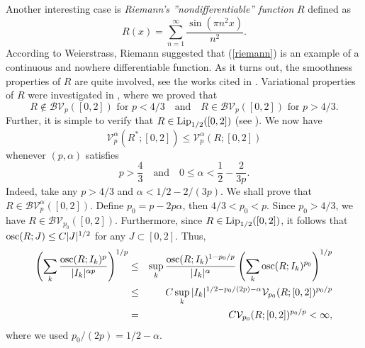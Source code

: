 \documentclass{amsart}
\DeclareMathOperator{\osc}{{\rm osc}}
\numberwithin{equation}{section}
\begin{document}
Another interesting case is \emph{Riemann's ''nondifferentiable'' function} $R$ defined as
\begin{equation}
    \label{riemann}
    R(x)=\sum_{n=1}^\infty\frac{\sin(\pi n^2x)}{n^2}.
\end{equation}
According to Weierstrass, Riemann suggested that (\ref{riemann}) is an example of a continuous and nowhere differentiable function. As it turns out, the smoothness properties of $R$ are quite involved, see the works cited in \cite{Li26}. Variational properties of $R$ were investigated in \cite{Li26}, where we proved that
\begin{equation}
    \label{p-var-R}
    R\notin\mathcal{BV}_p([0,2])\text{ for }p<4/3\quad\text{and}\quad R\in\mathcal{BV}_p([0,2])\text{ for }p>4/3.
\end{equation}
Further, it is simple to verify that $R\in{\rm Lip}_{1/2}([0,2])$ (see \cite{Li26}). We now have
\begin{equation}
    \nonumber
    \mathcal{V}_p^\alpha(R^*;[0,2])\le\mathcal{V}_p^\alpha(R;[0,2])
\end{equation}
whenever $(p,\alpha)$ satisfies
\begin{equation}
    \label{parameterChoice}
    p>\frac{4}{3}\quad\text{and}\quad0\le \alpha<\frac{1}{2}-\frac{2}{3p}.
\end{equation}
Indeed, take any $p>4/3$ and $\alpha<1/2-2/(3p)$.
We shall prove that $R\in\mathcal{BV}_p^\alpha([0,2])$. Define $p_0=p-2p\alpha$, then $4/3<p_0<p$. Since $p_0>4/3$, we have $R\in\mathcal{BV}_{p_0}([0,2])$. Furthermore, since $R\in{\rm Lip}_{1/2}([0,2])$, it follows that $\osc(R;J)\le C|J|^{1/2}$ for any $J\subset[0,2]$. Thus,
    \begin{eqnarray}
    \nonumber
    \left(\sum_k\frac{\osc(R;I_k)^p}{|I_k|^{\alpha p}}\right)^{1/p}&\le&\sup_k\frac{\osc(R;I_k)^{1-p_0/p}}{|I_k|^{\alpha}}\left(\sum_k\osc(R;I_k)^{p_0}\right)^{1/p}\\
    \nonumber
    &\le&C\sup_k|I_k|^{1/2-p_0/(2p)-\alpha}\mathcal{V}_{p_0}(R;[0,2])^{p_0/p}\\
    \nonumber
    &=&C\mathcal{V}_{p_0}(R;[0,2])^{p_0/p}<\infty,
    \end{eqnarray}
where we used $p_0/(2p)=1/2-\alpha$.
\end{document}
